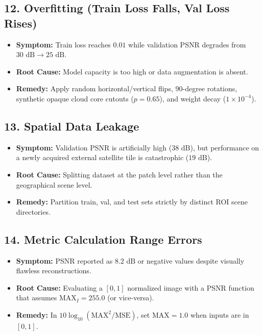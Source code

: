 \subsection{12. Overfitting (Train Loss Falls, Val Loss Rises)}
\begin{itemize}
    \item \textbf{Symptom:} Train loss reaches $0.01$ while validation PSNR degrades from $30\text{ dB} \to 25\text{ dB}$.
    \item \textbf{Root Cause:} Model capacity is too high or data augmentation is absent.
    \item \textbf{Remedy:} Apply random horizontal/vertical flips, 90-degree rotations, synthetic opaque cloud core cutouts ($p=0.65$), and weight decay ($1\times 10^{-4}$).
\end{itemize}

\subsection{13. Spatial Data Leakage}
\begin{itemize}
    \item \textbf{Symptom:} Validation PSNR is artificially high ($38\text{ dB}$), but performance on a newly acquired external satellite tile is catastrophic ($19\text{ dB}$).
    \item \textbf{Root Cause:} Splitting dataset at the patch level rather than the geographical scene level.
    \item \textbf{Remedy:} Partition train, val, and test sets strictly by distinct ROI scene directories.
\end{itemize}

\subsection{14. Metric Calculation Range Errors}
\begin{itemize}
    \item \textbf{Symptom:} PSNR reported as $8.2\text{ dB}$ or negative values despite visually flawless reconstructions.
    \item \textbf{Root Cause:} Evaluating a $[0, 1]$ normalized image with a PSNR function that assumes $\text{MAX}_I = 255.0$ (or vice-versa).
    \item \textbf{Remedy:} In $10 \log_{10}(\text{MAX}^2 / \text{MSE})$, set $\text{MAX} = 1.0$ when inputs are in $[0, 1]$.
\end{itemize}

